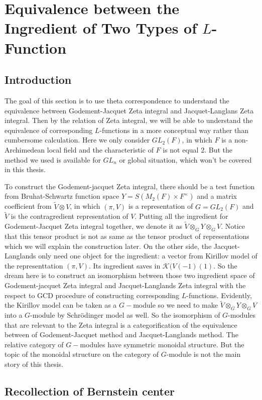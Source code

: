 \documentclass[12pt,a4paper,english]{article}
\theoremstyle{plain}
\theoremstyle{definition}
\begin{document}
\section{Equivalence between the Ingredient of Two Types of $L$-Function}
\subsection{Introduction}
The goal of this section is to use theta correspondence to understand the equivalence between Godement-Jacquet Zeta integral and Jacquet-Langlans Zeta integral. Then by the relation of Zeta integral, we will be able to understand the equivalence of corresponding $L$-functions in a more conceptual way rather than cumbersome calculation. Here we only consider $GL_{2}(F)$, in which $F$ is a non-Archimedean local field and the characteristic of $F$ is not equal 2. But the method we used is available for $GL_{n}$ or global situation, which won't be covered in this thesis.

To construct the Godement-jacquet Zeta integral, there should be a test function from Bruhat-Schwartz function space $Y=S(M_{2}(F)\times F^{\times})$ and a matrix coefficient from $\widetilde{V}\otimes V$, in which $(\pi, V)$ is a representation of $G=GL_{2}(F)$ and $\tilde{V}$ is the contragredient representation of $V$. Putting all the ingredient for Godement-Jacquet Zeta integral together, we denote it as $\widetilde{V}\otimes_{G}Y\otimes_{G}V$. Notice that this tensor product is not as same as the tensor product of representations which we will explain the construction later.  On the other side, the Jacquet-Langlands only need one object for the ingredient: a vector from Kirillov model of the representtation $(\pi, V)$. Its ingredient saves in $\mathcal{K}(V(-1)(1)$. So the dream here is to construct an isomorphism between those two ingredient space of Godement-jacquet Zeta integral and Jacquet-Langlands Zeta integral with the respect to GCD procedure of constructing corresponding $L$-functions. Evidently, the Kirillov model can be taken as a $G-$module so we need to make $\widetilde{V}\otimes_{G}Y\otimes_{G} V$ into a $G$-module by Schr\"{o}dinger model as well. So the isomorphism of $G$-modules that are relevant to the Zeta integral is a categorification of the  equivalence between of Godement-Jacquet method and Jacquet-Langlands method. The relative category of $G-$modules have symmetric monoidal structure. But the topic of the monoidal structure on the category of $G$-module is not the main story of this thesis. 
\subsection{Recollection of Bernstein center}\label{Bernstein}
\end{document}
